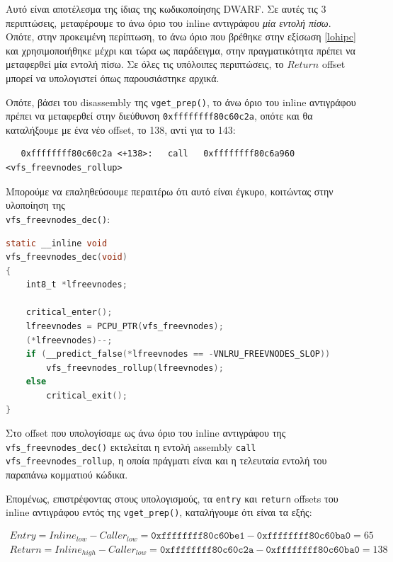 \documentclass[12pt]{article}
\begin{document}
Αυτό είναι αποτέλεσμα της ίδιας της κωδικοποίησης DWARF. Σε αυτές τις 3
περιπτώσεις, μεταφέρουμε το άνω όριο του inline αντιγράφου \textit{μία εντολή
πίσω}. Οπότε, στην προκειμένη περίπτωση, το άνω όριο που βρέθηκε στην εξίσωση
\ref{lohipc} και χρησιμοποιήθηκε μέχρι και τώρα ως παράδειγμα, στην
πραγματικότητα πρέπει να μεταφερθεί μία εντολή πίσω. Σε όλες τις υπόλοιπες
περιπτώσεις, το $Return$ offset μπορεί να υπολογιστεί όπως παρουσιάστηκε
αρχικά.

Οπότε, βάσει του disassembly της \lstinline{vget_prep()}, το άνω όριο του
inline αντιγράφου πρέπει να μεταφερθεί στην διεύθυνση
\lstinline{0xffffffff80c60c2a}, οπότε και θα καταλήξουμε με ένα νέο offset, το
138, αντί για το 143:

\begin{lstlisting}
   0xffffffff80c60c2a <+138>:   call   0xffffffff80c6a960 <vfs_freevnodes_rollup>
\end{lstlisting}

Μπορούμε να επαληθεύσουμε περαιτέρω ότι αυτό είναι έγκυρο, κοιτώντας στην
υλοποίηση της \\
\lstinline{vfs_freevnodes_dec()}:

\begin{lstlisting}[language=C]
static __inline void
vfs_freevnodes_dec(void)
{
	int8_t *lfreevnodes;

	critical_enter();
	lfreevnodes = PCPU_PTR(vfs_freevnodes);
	(*lfreevnodes)--;
	if (__predict_false(*lfreevnodes == -VNLRU_FREEVNODES_SLOP))
		vfs_freevnodes_rollup(lfreevnodes);
	else
		critical_exit();
}
\end{lstlisting}

Στο offset που υπολογίσαμε ως άνω όριο του inline αντιγράφου της
\lstinline{vfs_freevnodes_dec()} εκτελείται η εντολή assembly
\lstinline{call vfs_freevnodes_rollup}, η οποία πράγματι είναι και η τελευταία
εντολή του παραπάνω κομματιού κώδικα.

Επομένως, επιστρέφοντας στους υπολογισμούς, τα \lstinline{entry} και
\lstinline{return} offsets του inline αντιγράφου εντός της
\lstinline{vget_prep()}, καταλήγουμε ότι είναι τα εξής:

\begin{equation}
\begin{split}
	Entry = Inline_{low} - Caller_{low} =
	\mathtt{0xffffffff80c60be1} - \mathtt{0xffffffff80c60ba0} = 65 \\
	Return = Inline_{high} - Caller_{low} =
	\mathtt{0xffffffff80c60c2a} - \mathtt{0xffffffff80c60ba0} = 138
\end{split}
\label{offsetscorrect}
\end{equation}
\end{document}
